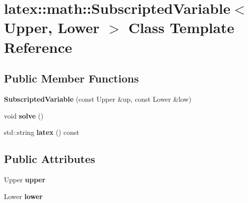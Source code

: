 \hypertarget{classlatex_1_1math_1_1SubscriptedVariable}{\section{latex\-:\-:math\-:\-:\-Subscripted\-Variable$<$ \-Upper, \-Lower $>$ \-Class \-Template \-Reference}
\label{classlatex_1_1math_1_1SubscriptedVariable}
}
\subsection*{\-Public \-Member \-Functions}
\begin{DoxyCompactItemize}
\item 
\hypertarget{classlatex_1_1math_1_1SubscriptedVariable_a01379fa1ca54ff2c24925e2f4cf588fb}{{\bfseries \-Subscripted\-Variable} (const \-Upper \&up, const \-Lower \&low)}\label{classlatex_1_1math_1_1SubscriptedVariable_a01379fa1ca54ff2c24925e2f4cf588fb}

\item 
\hypertarget{classlatex_1_1math_1_1SubscriptedVariable_ab5203d3b8e0b98cc8ffd132faee47fc1}{void {\bfseries solve} ()}\label{classlatex_1_1math_1_1SubscriptedVariable_ab5203d3b8e0b98cc8ffd132faee47fc1}

\item 
\hypertarget{classlatex_1_1math_1_1SubscriptedVariable_a105cdaf00548080f2adb1941f21ef0e0}{std\-::string {\bfseries latex} () const }\label{classlatex_1_1math_1_1SubscriptedVariable_a105cdaf00548080f2adb1941f21ef0e0}

\end{DoxyCompactItemize}
\subsection*{\-Public \-Attributes}
\begin{DoxyCompactItemize}
\item 
\hypertarget{classlatex_1_1math_1_1SubscriptedVariable_ad840053085689eeb300eba0f8abdd365}{\-Upper {\bfseries upper}}\label{classlatex_1_1math_1_1SubscriptedVariable_ad840053085689eeb300eba0f8abdd365}

\item 
\hypertarget{classlatex_1_1math_1_1SubscriptedVariable_aaa25b87641633bc574072c06830ba371}{\-Lower {\bfseries lower}}\label{classlatex_1_1math_1_1SubscriptedVariable_aaa25b87641633bc574072c06830ba371}

\end{DoxyCompactItemize}
